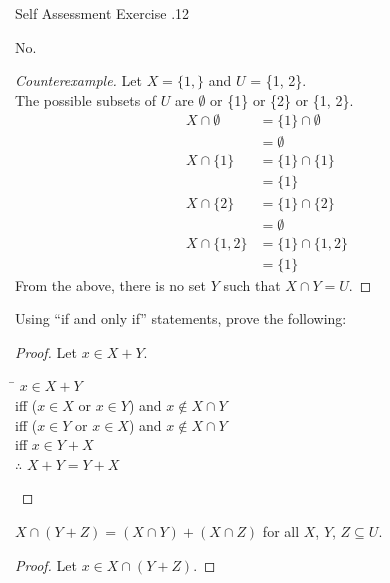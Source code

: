\documentclass[\main/notes.tex]{subfiles}
\begin{document}
\begin{exercise}{Self Assessment Exercise \thechapter.12}
\begin{questions}
						\begin{answer}
							No.
							\begin{proof}[Counterexample]
								Let $X = \{1,\}$ and $U$ = \{1, 2\}.\\
								The possible subsets of $U$ are $\emptyset$ or \{1\} or \{2\} or \{1, 2\}.
								\begin{align*}
									X \cap \emptyset &= \{1\} \cap \emptyset\\
									&= \emptyset\\
									X \cap \{1\} &= \{1\} \cap \{1\}\\
									&= \{1\}\\
									X \cap \{2\} &= \{1\} \cap \{2\}\\
									&= \emptyset\\
									X \cap \{1, 2\} &= \{1\} \cap \{1, 2\}\\
									&= \{1\}
								\end{align*}
								From the above, there is no set $Y$ such that $X \cap Y = U$.
							\end{proof}
						\end{answer}
					\item Using ``if and only if'' statements, prove the following:
						\begin{questions}[first=\bfseries]
							\item {}
								\begin{answer}
									\begin{proof}
										Let $x \in X + Y$.
										\begin{tabbing}
											\qquad \= $x \in X + Y$\\
											iff \> ($x \in X$ or $x \in Y$) and $x \notin X \cap Y$\\
											iff \> ($x \in Y$ or $x \in X$) and $x \notin X \cap Y$\\
											iff \> $x \in Y + X$\\
											$\therefore$ \> $X + Y = Y + X$
										\end{tabbing}
									\end{proof}
								\end{answer}
							\pagebreak
							\item $X \cap (Y + Z) = (X \cap Y) + (X \cap Z)$ for all $X$, $Y$, $Z \subseteq U$.
								\begin{answer}
									\begin{proof}
										Let $x \in X \cap (Y + Z)$.

\end{proof}
\end{answer}
\end{questions}
\end{questions}
\end{exercise}
\end{document}
